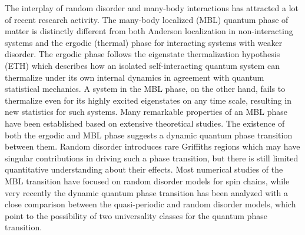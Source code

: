 \documentclass[prl,aps,epsf,showpacs,twocolumn,letterpaper]{revtex4}
\begin{document}
The interplay of random disorder and many-body interactions has attracted a lot 
of recent research activity\cite{basko2006, oganesyan2007, pal2010, 
znidaric2008, huse2013, nandkishore2015, altman2015, huse2014, nandkishore2014, 
pekker_hilbert2014}.  The many-body localized (MBL) quantum 
phase\cite{nandkishore2015, altman2015, huse2014, nandkishore2014, 
pekker_hilbert2014} of matter is distinctly different from both Anderson 
localization in non-interacting systems and the ergodic (thermal) phase for 
interacting systems with weaker disorder.  The ergodic phase follows the 
eigenstate thermalization hypothesis (ETH) which describes how an isolated 
self-interacting quantum system can thermalize under its own internal dynamics 
in agreement with quantum statistical mechanics\cite{deutsch1991, 
srednicki1994, rigol2008}.  A system in the MBL phase, on the other hand, fails 
to thermalize even for its highly excited eigenstates on any time scale, 
resulting in new statistics for such systems\cite{basko2006, oganesyan2007, 
pal2010, znidaric2008, huse2013, nandkishore2015, altman2015, huse2014, 
nandkishore2014, pekker_hilbert2014}.  Many remarkable properties of an MBL 
phase have been established\cite{nandkishore2015, altman2015, huse2013, 
nandkishore2014, oganesyan2007, pal2010, znidaric2008, rigol2008, serbyn2014, 
kwasigroch2014, yao2014, vasseur2015, huse2014, serbyn2013, ros2015, 
chandran2014, grover2014, agarwal2015, knap2015, luitz2015, devakul2015, 
torres2015, canovi2011, cuevas2012, bauer2013, kjall2014, luca2013, iyer2013, 
pekker_hilbert2014, johri2014, bardarson2012, andraschko2014, laumann2014, 
hickey2014, nanduri2014, barlev2014, imbrie2014, groverf2014, ponte2015, 
huang2015, you2015, serbyn2015, singh2015, barlev2015, deng2015, chen2015} 
based on extensive theoretical studies.  The existence of both the ergodic and 
MBL phase suggests a dynamic quantum phase transition between 
them\cite{basko2006, pal2010, oganesyan2007, kjall2014, vosk_theory2014, 
potter2015trans, serbyn2015, agarwal2015, knap2015, lim2016, zhang2016, 
zhang2016a, yu2016, vedika2016, dumitrescu2017}.  Random disorder introduces 
rare Griffiths regions\cite{vosk_theory2014, potter2015trans, 
knap2015,luitz2015,lim2016} which may have singular contributions in driving 
such a phase transition, but there is still limited quantitative understanding 
about their effects\cite{vedika2017}.  Most numerical studies of the MBL 
transition have focused on random disorder models for spin chains\cite{pal2010, 
kjall2014, luitz2015, yu2016, vedika2016}, while very recently the dynamic 
quantum phase transition has been analyzed with a close comparison between the 
quasi-periodic and random disorder models, which point to the possibility of 
two universality classes for the quantum phase transition\cite{vedika2017, 
vedika2016}.
\end{document}
